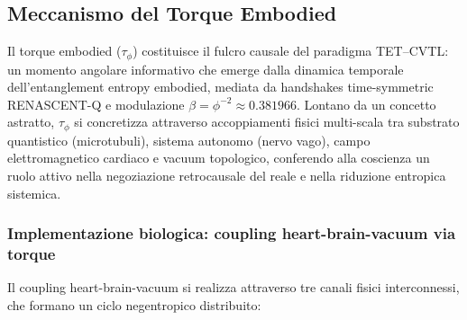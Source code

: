 \documentclass[11pt,a4paper]{article}
\theoremstyle{plain}
\theoremstyle{definition}
\begin{document}
\vspace{0.4cm}


\subsection{Meccanismo del Torque Embodied}

Il torque embodied ($\tau_\phi$) costituisce il fulcro causale del paradigma TET–CVTL: un momento angolare informativo che emerge dalla dinamica temporale dell'entanglement entropy embodied, mediata da handshakes time-symmetric RENASCENT-Q e modulazione $\beta = \phi^{-2} \approx 0.381966$. Lontano da un concetto astratto, $\tau_\phi$ si concretizza attraverso accoppiamenti fisici multi-scala tra substrato quantistico (microtubuli), sistema autonomo (nervo vago), campo elettromagnetico cardiaco e vacuum topologico, conferendo alla coscienza un ruolo attivo nella negoziazione retrocausale del reale e nella riduzione entropica sistemica.


\vspace{0.4cm}

\subsubsection{Implementazione biologica: coupling heart-brain-vacuum via torque}


\vspace{0.3cm}

Il coupling heart-brain-vacuum si realizza attraverso tre canali fisici interconnessi, che formano un ciclo negentropico distribuito:

\vspace{0.3cm}
\end{document}
